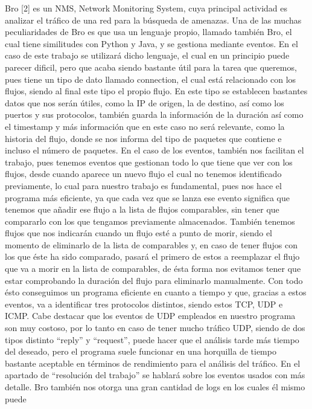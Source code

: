 Bro [2] es un NMS, Network Monitoring System, cuya principal actividad 
es analizar el tráfico de una red para la búsqueda de amenazas. Una de 
las muchas peculiaridades de Bro es que usa un lenguaje propio, llamado 
también Bro, el cual tiene similitudes con Python y Java, y se gestiona 
mediante eventos. En el caso de este trabajo se utilizará dicho lenguaje, 
el cual en un principio puede parecer dificil, pero que acaba siendo 
bastante útil para la tarea que queremos, pues tiene un tipo de dato 
llamado connection, el cual está relacionado con los flujos, siendo al 
final este tipo el propio flujo. En este tipo se establecen bastantes 
datos que nos serán útiles, como la IP de origen, la de destino, así 
como los puertos y sus protocolos, también guarda la información de la 
duración así como el timestamp y más información que en este caso no 
será relevante, como la historia del flujo, donde se nos informa del 
tipo de paquetes que contiene e incluso el número de paquetes.
\intro
En el caso de los eventos, también nos facilitan el trabajo, pues tenemos 
eventos que gestionan todo lo que tiene que ver con los flujos, desde 
cuando aparece un nuevo flujo el cual no tenemos identificado previamente, 
lo cual para nuestro trabajo es fundamental, pues nos hace el programa más 
eficiente, ya que cada vez que se lanza ese evento significa que tenemos 
que añadir ese flujo a la lista de flujos comparables, sin tener que 
compararlo con los que tengamos previamente almacenados. También tenemos 
flujos que nos indicarán cuando un flujo esté a punto de morir, siendo el 
momento de eliminarlo de la lista de comparables y, en caso de tener 
flujos con los que éste ha sido comparado, pasará el primero de estos a 
reemplazar el flujo que va a morir en la lista de comparables, de ésta 
forma nos evitamos tener que estar comprobando la duración del flujo 
para eliminarlo manualmente. Con todo ésto conseguimos un programa eficiente 
en cuanto a tiempo y que, gracias a estos eventos, va a identificar tres 
protocolos distintos, siendo estos TCP, UDP e ICMP. Cabe destacar que los 
eventos de UDP empleados en nuestro programa son muy costoso, por lo tanto 
en caso de tener mucho tráfico UDP, siendo de dos tipos distinto “reply” y 
“request”, puede hacer que el análisis tarde más tiempo del deseado, pero 
el programa suele funcionar en una horquilla de tiempo bastante aceptable 
en términos de rendimiento para el análisis del tráfico. En el apartado de 
“resolución del trabajo” se hablará sobre los eventos usados con más detalle.
\intro
Bro también nos otorga una gran cantidad de logs en los cuales él mismo puede 
